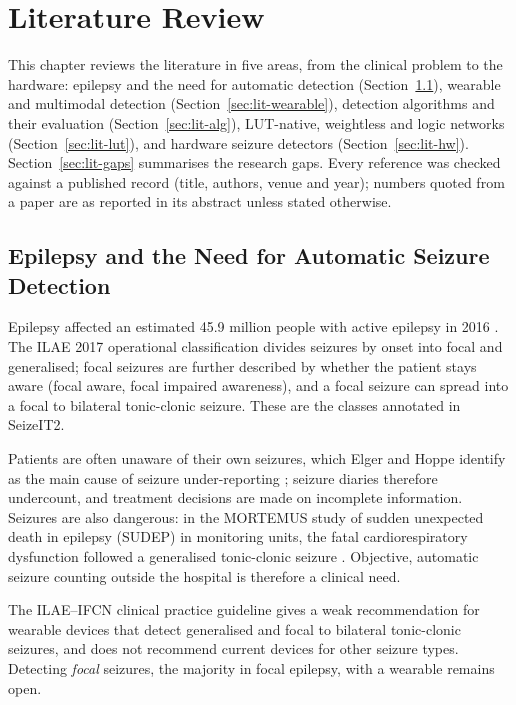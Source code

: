 \chapter{Literature Review}\label{ch:lit}

This chapter reviews the literature in five areas, from the clinical problem to the hardware: epilepsy and the need
for automatic detection (Section~\ref{sec:lit-clinical}), wearable and multimodal detection
(Section~\ref{sec:lit-wearable}), detection algorithms and their evaluation (Section~\ref{sec:lit-alg}), LUT-native,
weightless and logic networks (Section~\ref{sec:lit-lut}), and hardware seizure detectors
(Section~\ref{sec:lit-hw}). Section~\ref{sec:lit-gaps} summarises the research gaps. Every reference was checked
against a published record (title, authors, venue and year); numbers quoted from a paper are as reported in its
abstract unless stated otherwise.

\section{Epilepsy and the Need for Automatic Seizure Detection}\label{sec:lit-clinical}

Epilepsy affected an estimated 45.9 million people with active epilepsy in 2016 \cite{gbd2019epilepsy}. The ILAE 2017
operational classification \cite{fisher2017ilae} divides seizures by onset into focal and generalised; focal seizures
are further described by whether the patient stays aware (focal aware, focal impaired awareness), and a focal seizure
can spread into a focal to bilateral tonic-clonic seizure. These are the classes annotated in SeizeIT2.

Patients are often unaware of their own seizures, which Elger and Hoppe identify as the main cause of seizure
under-reporting \cite{elger2018underreporting}; seizure diaries therefore undercount, and treatment decisions are made
on incomplete information. Seizures are also dangerous: in the MORTEMUS study of sudden unexpected death in epilepsy
(SUDEP) in monitoring units, the fatal cardiorespiratory dysfunction followed a generalised tonic-clonic seizure
\cite{ryvlin2013mortemus}. Objective, automatic seizure counting outside the hospital is therefore a clinical need.

The ILAE--IFCN clinical practice guideline \cite{beniczky2021guideline} gives a weak recommendation for wearable
devices that detect generalised and focal to bilateral tonic-clonic seizures, and does not recommend current devices
for other seizure types. Detecting \emph{focal} seizures, the majority in focal epilepsy, with a wearable remains open.

